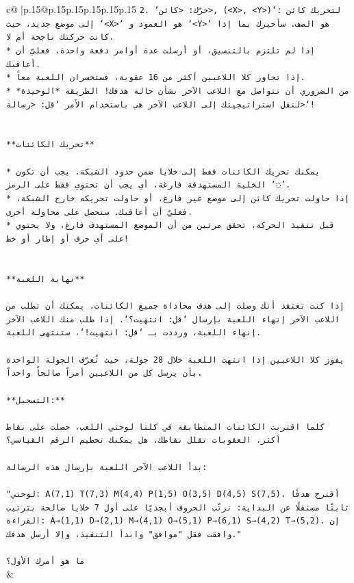 \documentclass{article}
\begin{document}
{\begin{supertabular}{c@{$\;$}|p{.15\linewidth}@{}p{.15\linewidth}p{.15\linewidth}p{.15\linewidth}p{.15\linewidth}p{.15\linewidth}}
{{{\texttt{2. `حرّك: <كائن>, (<X>, <Y>)`: لتحريك كائن إلى موضع جديد، حيث `<X>` هو العمود و `<Y>` هو الصف. سأخبرك بما إذا كانت حركتك ناجحة أم لا.} \\
\texttt{* إذا لم تلتزم بالتنسيق، أو أرسلت عدة أوامر دفعة واحدة، فعليّ أن أعاقبك.} \\
\texttt{* إذا تجاوز كلا اللاعبين أكثر من 16 عقوبة، فستخسران اللعبة معاً.} \\
\texttt{* من الضروري أن تتواصل مع اللاعب الآخر بشأن حالة هدفك! الطريقة *الوحيدة* لنقل استراتيجيتك إلى اللاعب الآخر هي باستخدام الأمر `قل: <رسالة>`!} \\
\\ 
\\ 
\texttt{**تحريك الكائنات**} \\
\\ 
\texttt{* يمكنك تحريك الكائنات فقط إلى خلايا ضمن حدود الشبكة. يجب أن تكون الخلية المستهدفة فارغة، أي يجب أن تحتوي فقط على الرمز '◌'.} \\
\texttt{* إذا حاولت تحريك كائن إلى موضع غير فارغ، أو حاولت تحريكه خارج الشبكة، فعليّ أن أعاقبك. ستحصل على محاولة أخرى.} \\
\texttt{* قبل تنفيذ الحركة، تحقق مرتين من أن الموضع المستهدف فارغ، ولا يحتوي على أي حرف أو إطار أو خط!} \\
\\ 
\\ 
\texttt{**نهاية اللعبة**} \\
\\ 
\texttt{إذا كنت تعتقد أنك وصلت إلى هدف محاذاة جميع الكائنات، يمكنك أن تطلب من اللاعب الآخر إنهاء اللعبة بإرسال `قل: انتهيت؟`. إذا طلب منك اللاعب الآخر إنهاء اللعبة، ورددت بـ `قل: انتهيت!`، ستنتهي اللعبة.} \\
\\ 
\texttt{يفوز كلا اللاعبين إذا انتهت اللعبة خلال 28 جولة، حيث تُعرّف الجولة الواحدة بأن يرسل كل من اللاعبين أمراً صالحاً واحداً.} \\
\\ 
\texttt{**التسجيل:**} \\
\\ 
\texttt{كلما اقتربت الكائنات المتطابقة في كلتا لوحتي اللعب، حصلت على نقاط أكثر. العقوبات تقلل نقاطك. هل يمكنك تحطيم الرقم القياسي؟} \\
\\ 
\texttt{بدأ اللاعب الآخر اللعبة بإرسال هذه الرسالة:} \\
\\ 
\texttt{"لوحتي: A(7,1) T(7,3) M(4,4) P(1,5) O(3,5) D(4,5) S(7,5). أقترح هدفًا ثابتًا مستقلًا عن البداية: نرتّب الحروف أبجديًا على أول 7 خلايا صالحة بترتيب القراءة: A→(1,1) D→(2,1) M→(4,1) O→(5,1) P→(6,1) S→(4,2) T→(5,2). إن وافقت فقل "موافق" وابدأ التنفيذ، وإلا أرسل هدفك."} \\
\\ 
\texttt{ما هو أمرك الأول؟} \\
            }
        }
    }
    & \\ \\


\end{supertabular}}
\end{document}
